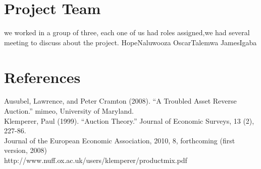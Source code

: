 \documentclass[11pt]{article} %
\begin{document}
\section{Project Team}

we worked in a group of three, each one of us had roles assigned,we had several meeting to discuss about the project. 
HopeNaluwooza
OscarTalemwa
JamesIgaba
\section{References}
Ausubel, Lawrence, and Peter Cramton (2008). “A Troubled Asset Reverse
Auction.” mimeo, University of Maryland.\\
Klemperer, Paul (1999). “Auction Theory.” Journal of Economic Surveys, 13
(2), 227-86.\\
Journal of the European Economic Association, 2010, 8, forthcoming
(first version, 2008)\\
http://www.nuff.ox.ac.uk/users/klemperer/productmix.pdf\\
\end{document}
